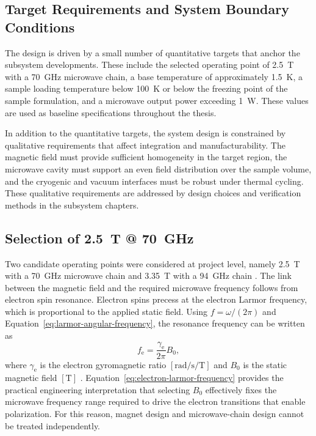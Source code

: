 \documentclass[FM,DP,EN,twoside]{tulthesis}
\begin{document}
\subsection{Target Requirements and System Boundary Conditions}
\label{subsec:target-requirements-boundary}

The design is driven by a small number of quantitative targets that anchor the subsystem developments. These include the selected operating point of \SI{2.5}{\tesla} with a \SI{70}{\giga\hertz} microwave chain, a base temperature of approximately \SI{1.5}{\kelvin}, a sample loading temperature below \SI{100}{\kelvin} or below the freezing point of the sample formulation, and a microwave output power exceeding \SI{1}{\watt}. These values are used as baseline specifications throughout the thesis.

In addition to the quantitative targets, the system design is constrained by qualitative requirements that affect integration and manufacturability. The magnetic field must provide sufficient homogeneity in the target region, the microwave cavity must support an even field distribution over the sample volume, and the cryogenic and vacuum interfaces must be robust under thermal cycling. These qualitative requirements are addressed by design choices and verification methods in the subsystem chapters.


\subsection{Selection of \SI{2.5}{\tesla} @ \SI{70}{\giga\hertz}}
\label{subsec:selection-2p5t-70ghz}
Two candidate operating points were considered at project level, namely \SI{2.5}{\tesla} with a \SI{70}{\giga\hertz} microwave chain and \SI{3.35}{\tesla} with a \SI{94}{\giga\hertz} chain \cite{Kowalska2023MABudget}. The link between the magnetic field and the required microwave frequency follows from electron spin resonance. Electron spins precess at the electron Larmor frequency, which is proportional to the applied static field. Using $f=\omega/(2\pi)$ and Equation~\ref{eq:larmor-angular-frequency}, the resonance frequency can be written as
\begin{equation}
f_\mathrm{e} = \frac{\gamma_\mathrm{e}}{2\pi} B_0,
\label{eq:electron-larmor-frequency}
\end{equation}
where $\gamma_\mathrm{e}$ is the electron gyromagnetic ratio \([\si{\radian\per\second\per\tesla}]\) and $B_0$ is the static magnetic field \([\si{\tesla}]\) \cite{electron_gyromagnetic_ratio_ref}. Equation~\ref{eq:electron-larmor-frequency} provides the practical engineering interpretation that selecting $B_0$ effectively fixes the microwave frequency range required to drive the electron transitions that enable polarization. For this reason, magnet design and microwave-chain design cannot be treated independently.
\end{document}
